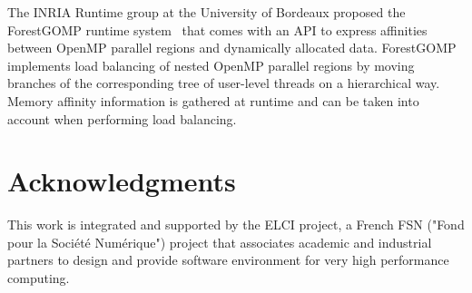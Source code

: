 \documentclass{Styles/llncs}
\begin{document}
The INRIA Runtime group at the University of Bordeaux proposed the
ForestGOMP runtime system~\cite{BroFurGogWacNam10IJPP} that comes
with an API to express affinities between OpenMP parallel regions and
dynamically allocated data. ForestGOMP implements load balancing of
nested OpenMP parallel regions by moving branches of the corresponding
tree of user-level threads on a hierarchical way. Memory affinity
information is gathered at runtime and can be taken into account when
performing load balancing.

\section*{Acknowledgments}


This work is integrated and supported by the ELCI  project, a French FSN ("Fond pour la Société Numérique")
project that associates academic and industrial partners to design and provide software environment for very high performance
computing.
  \small 

\end{document}
